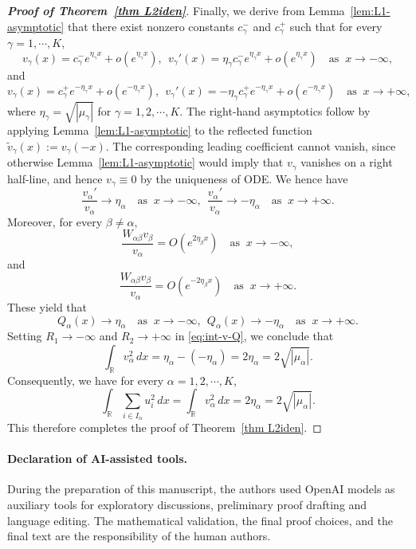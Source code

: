 \documentclass[11pt]{article}
\numberwithin{equation}{section}
\theoremstyle{definition}
\begin{document}
\begin{proof}[\normalfont \bfseries Proof of Theorem~\ref{thm L2iden}]
Finally, we derive from Lemma~\ref{lem:L1-asymptotic} that there exist nonzero constants
\(c_\gamma^-\) and \(c_\gamma^+\) such that  for every
\(\gamma=1,\cdots,K\),
\[
v_\gamma(x)=c_\gamma^-e^{\eta_\gamma x}
+o(e^{\eta_\gamma x}),
\ \
v_\gamma'(x)=\eta_\gamma c_\gamma^-e^{\eta_\gamma x}
+o(e^{\eta_\gamma x})
\quad \text{as }\ x\to-\infty,
\]
and
\[
v_\gamma(x)=c_\gamma^+e^{-\eta_\gamma x}
+o(e^{-\eta_\gamma x}),
\ \
v_\gamma'(x)=-\eta_\gamma c_\gamma^+e^{-\eta_\gamma x}
+o(e^{-\eta_\gamma x})
\quad \text{as }\ x\to+\infty,
\]
where $\eta_\gamma=\sqrt{|\mu_\gamma|}$ for $\gamma=1,2,\cdots,K$.
The right-hand asymptotics follow by applying
Lemma~\ref{lem:L1-asymptotic} to the reflected function
\(\widetilde v_\gamma(x):=v_\gamma(-x)\). The corresponding leading
coefficient cannot vanish, since otherwise Lemma~\ref{lem:L1-asymptotic} would
imply that \(v_\gamma\) vanishes on a right half-line, and hence
\(v_\gamma\equiv0\) by the uniqueness of ODE.
We hence have
\[
\frac{v_\alpha'}{v_\alpha}\to\eta_\alpha
\quad\text{as }\ x\to-\infty,
\ \
\frac{v_\alpha'}{v_\alpha}\to-\eta_\alpha
\quad\text{as }\ x\to+\infty.
\]
Moreover, for every \(\beta\neq\alpha\),
\[
\frac{W_{\alpha\beta}v_\beta}{v_\alpha}
=O(e^{2\eta_\beta x})
\quad\text{as }\ x\to-\infty,
\]
and
\[
\frac{W_{\alpha\beta}v_\beta}{v_\alpha}
=O(e^{-2\eta_\beta x})
\quad\text{as }\ x\to+\infty.
\]
These yield that
\[
Q_\alpha(x)\to\eta_\alpha
\quad\text{as }\ x\to-\infty,
\ \
Q_\alpha(x)\to-\eta_\alpha
\quad\text{as } \ x\to+\infty.
\]
Setting \(R_1\to-\infty\) and \(R_2\to+\infty\) in
\eqref{eq:int-v-Q}, we conclude that
\[
\int_{\mathbb R}v_\alpha^2\,dx
=
\eta_\alpha-(-\eta_\alpha)
=
2\eta_\alpha=2\sqrt{|\mu_\alpha|}.
\]
Consequently, we have for every $\alpha=1,2,\cdots,K$,
\[
\int_{\mathbb R}\sum_{i\in I_\alpha}u_i^2\,dx
=
\int_{\mathbb R}v_\alpha^2\,dx
=
2\eta_\alpha=2\sqrt{|\mu_\alpha|}.
\]
This therefore completes the proof of Theorem~\ref{thm L2iden}.
\end{proof}




\paragraph{Declaration of AI-assisted tools.}
During the preparation of this manuscript, the authors used OpenAI models as auxiliary tools for exploratory discussions, preliminary proof drafting and language editing. The
mathematical validation, the final proof choices, and the final text are the responsibility
of the human authors.
\end{document}
